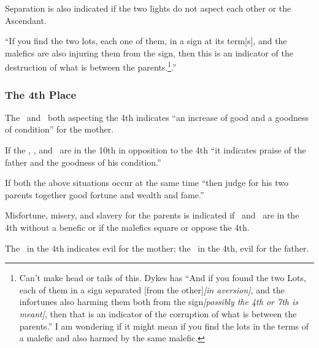 Separation is also indicated if the two lights do not aspect each other or the Ascendant.

``If you find the two lots, each one of them, in a sign at its term[s], and the malefics are also injuring them from the sign, then this is an indicator of the destruction of what is between the parents.\footnote{Can't make head or tails of this. Dykes has ``And if you found the two Lots, each of them in a sign separated [from the other]\textsl{[in aversion]}, and the infortunes also harming them both from the sign\textsl{[possibly the 4th or 7th is meant]}, then that is an indicator of the corruption of what is between the parents.'' I am wondering if it might mean if you find the lots in the terms of a malefic and also harmed by the same malefic.}.''

\subsubsection{The 4th Place}
The \Moon\, and \Venus\, both aspecting the 4th indicates ``an increase of good and a goodness of condition'' for the mother.

If the \Sun, \Jupiter, and \Saturn\, are in the 10th in opposition to the 4th ``it indicates praise of the father and the goodness of his condition.'' 

If both the above situations occur at the same time ``then judge for his two parents together good fortune and wealth and fame.''

Misfortune, misery, and slavery for the parents is indicated if \Mars\, and \Saturn\, are in the 4th without a benefic or if the malefics square or oppose the 4th.

The \Moon\, in the 4th indicates evil for the mother; the \Sun\, in the 4th, evil for the father.




